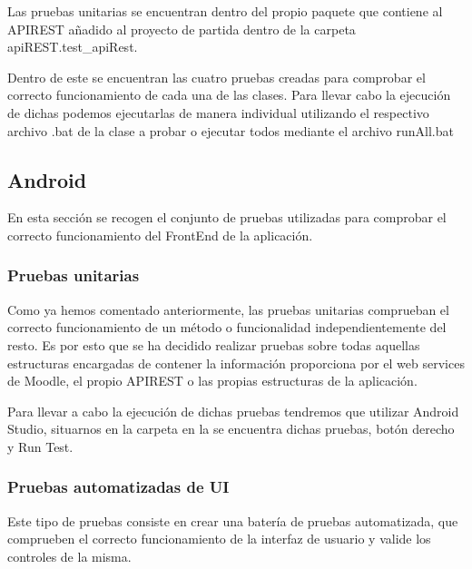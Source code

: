Las pruebas unitarias se encuentran dentro del propio paquete que contiene al APIREST añadido al proyecto de partida dentro de la carpeta apiREST.test\_apiRest. 


Dentro de este se encuentran las cuatro pruebas creadas para comprobar el correcto funcionamiento de cada una de las clases. Para llevar cabo la ejecución de dichas podemos ejecutarlas de manera individual utilizando el respectivo archivo .bat de la clase a probar o ejecutar todos mediante el archivo runAll.bat

\subsection{Android}

En esta sección se recogen el conjunto de pruebas utilizadas para comprobar el correcto funcionamiento del FrontEnd de la aplicación.

\subsubsection{Pruebas unitarias}

Como ya hemos comentado anteriormente, las pruebas unitarias comprueban el correcto funcionamiento de un método o funcionalidad independientemente del resto. Es por esto que se ha decidido realizar pruebas sobre todas aquellas estructuras encargadas de contener la información proporciona por el web services de Moodle, el propio APIREST o las propias estructuras de la aplicación.


Para llevar a cabo la ejecución de dichas pruebas tendremos que utilizar Android Studio, situarnos en la carpeta en la se encuentra dichas pruebas, botón derecho y Run Test.


\subsubsection{Pruebas automatizadas de UI}

Este tipo de pruebas consiste en crear una batería de pruebas automatizada, que comprueben el correcto funcionamiento de la interfaz de usuario y valide los controles de la misma. 

